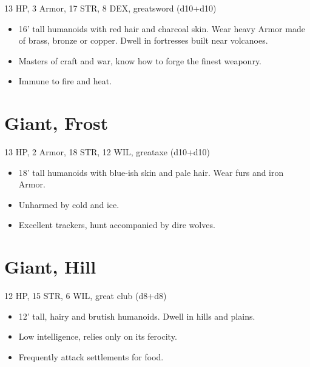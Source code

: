 \documentclass[
  10pt,
  american,
]{article}
\begin{document}
13 HP, 3 Armor, 17 STR, 8 DEX, greatsword (d10+d10)

\begin{samepage}
\begin{itemize}
\setlength\itemsep{-.5em}
\item 16’ tall humanoids with red hair and charcoal skin. Wear heavy Armor made of brass, bronze or copper. Dwell in fortresses built near volcanoes.
\item Masters of craft and war, know how to forge the finest weaponry.
\item Immune to fire and heat.
\end{itemize}
\end{samepage}

\hypertarget{giant-frost}{%
\section{Giant, Frost}\label{giant-frost}}

13 HP, 2 Armor, 18 STR, 12 WIL, greataxe (d10+d10)

\begin{samepage}
\begin{itemize}
\setlength\itemsep{-.5em}
\item 18’ tall humanoids with blue-ish skin and pale hair. Wear furs and iron Armor.
\item Unharmed by cold and ice.
\item Excellent trackers, hunt accompanied by dire wolves.
\end{itemize}
\end{samepage}

\hypertarget{giant-hill}{%
\section{Giant, Hill}\label{giant-hill}}

12 HP, 15 STR, 6 WIL, great club (d8+d8)

\begin{samepage}
\begin{itemize}
\setlength\itemsep{-.5em}
\item 12’ tall, hairy and brutish humanoids. Dwell in hills and plains.
\item Low intelligence, relies only on its ferocity.
\item Frequently attack settlements for food.
\end{itemize}
\end{samepage}
\end{document}
